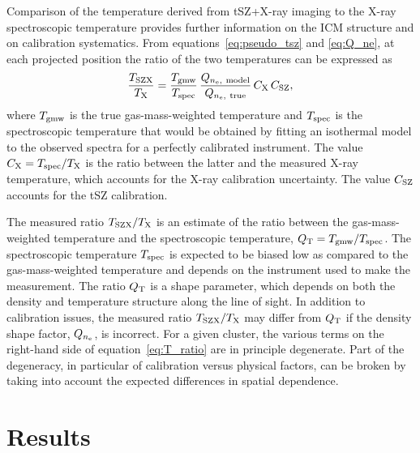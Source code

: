 \documentclass[twocolumn,traditabstract]{aa}
\def\TSZ {T_{\rm SZX}}
\def\TMW {T_{\rm gmw}}
\def \TX {T_{\rm X}}
\begin{document}
Comparison of the temperature derived from tSZ+X-ray imaging to the X-ray spectroscopic temperature provides further information on the ICM structure and on calibration systematics. From equations~\ref{eq:pseudo_tsz} and \ref{eq:Q_ne}, at each projected position the ratio of the two temperatures can be expressed as
\begin{equation}
        \frac{\TSZ }{\TX} = \frac{\TMW}{T_{\rm spec}}\,\frac{Q_{n_{\rm e}, \ {\rm model}}} {Q_{n_{\rm e}, \ {\rm true}}} \, C_{\rm X}\,C_{\rm SZ},
\label{eq:T_ratio}
\end{equation}
where $\TMW$ is the true gas-mass-weighted temperature and $T_{\rm spec}$ is the spectroscopic temperature that would be obtained by fitting an isothermal model to the observed spectra for a perfectly calibrated instrument. The value $C_{\rm X} = T_{\rm spec}/\TX$ is the ratio between the latter and the measured X-ray temperature, which accounts for the X-ray calibration uncertainty. The value $C_{\rm SZ}$ accounts for the tSZ calibration.

The measured ratio $\TSZ/\TX$ is an estimate of the ratio between the gas-mass-weighted temperature and the spectroscopic temperature, $Q{_{\rm T}}= \TMW/T_{\rm spec}$. The spectroscopic temperature $T_{\rm spec}$ is expected to be biased low as compared to the gas-mass-weighted temperature and depends on the instrument used to make the measurement. The ratio $Q_{\rm T}$ is a shape parameter, which depends on both the density and temperature structure along the line of sight. In addition to calibration issues, the measured ratio $\TSZ/\TX$ may differ from $Q{_{\rm T}}$ if the density shape factor, $Q_{n_{\rm e}}$, is incorrect. For a given cluster, the various terms on the right-hand side of equation~\ref{eq:T_ratio} are in principle degenerate. Part of the degeneracy, in particular of calibration versus physical factors, can be broken by taking into account the expected differences in spatial dependence.

\section{Results}\label{sec:results}
\end{document}
